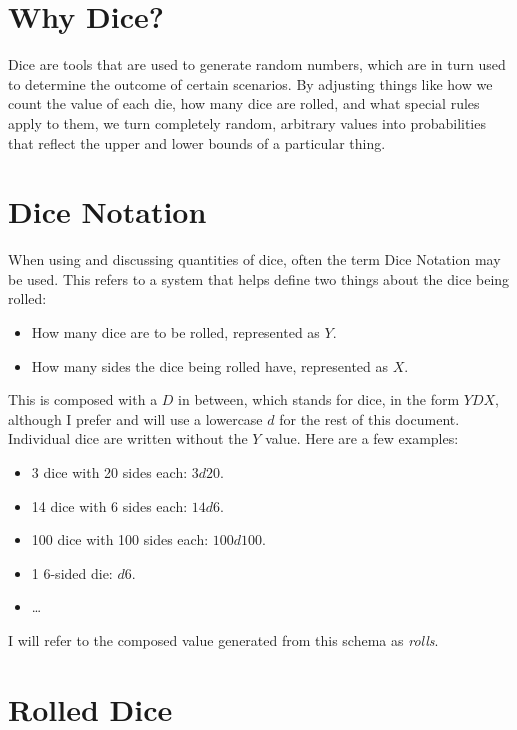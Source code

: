 \documentclass[../main.tex]{subfiles}
\begin{document}
    \section{Why Dice?}

    Dice are tools that are used to generate random numbers, which are in turn used to determine the outcome of certain scenarios. By adjusting things like how we count the value of each die, how many dice are rolled, and what special rules apply to them, we turn completely random, arbitrary values into probabilities that reflect the upper and lower bounds of a particular thing.

    \section{Dice Notation}

    When using and discussing quantities of dice, often the term Dice Notation may be used. This refers to a system that helps define two things about the dice being rolled:

    \begin{itemize}
        \item How many dice are to be rolled, represented as $Y$.
        \item How many sides the dice being rolled have, represented as $X$.
    \end{itemize}

    This is composed with a $D$ in between, which stands for dice, in the form $YDX$, although I prefer and will use a lowercase $d$ for the rest of this document. Individual dice are written without the $Y$ value. Here are a few examples:

    \begin{itemize}
        \item 3 dice with 20 sides each: $3d20$.
        \item 14 dice with 6 sides each: $14d6$.
        \item 100 dice with 100 sides each: $100d100$.
        \item 1 6-sided die: $d6$.
        \item \dots
    \end{itemize}

    I will refer to the composed value generated from this schema as {\em rolls}.

    \section{Rolled Dice}
\end{document}
